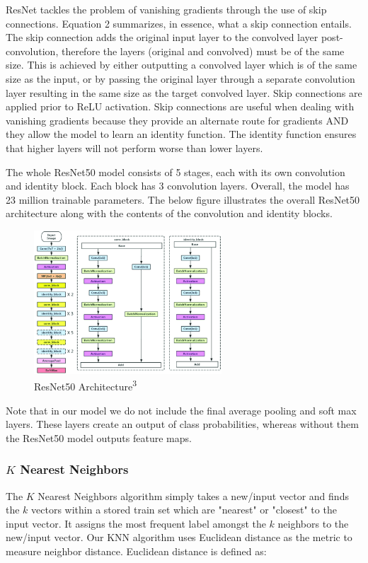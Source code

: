\documentclass[conference]{IEEEtran}
\begin{document}
ResNet tackles the problem of vanishing gradients through the use of skip connections. Equation 2 summarizes, in essence, what a skip connection entails. The skip connection adds the original input layer to the convolved layer post-convolution, therefore the layers (original and convolved) must be of the same size. This is achieved by either outputting a convolved layer which is of the same size as the input, or by passing the original layer through a separate convolution layer resulting in the same size as the target convolved layer. Skip connections are applied prior to ReLU activation. Skip connections are useful when dealing with vanishing gradients because they provide an alternate route for gradients AND they allow the model to learn an identity function. The identity function ensures that higher layers will not perform worse than lower layers.

The whole ResNet50 model consists of 5 stages, each with its own convolution and identity block. Each block has 3 convolution layers. Overall, the model has 23 million trainable parameters. The below figure illustrates the overall ResNet50 architecture along with the contents of the convolution and identity blocks.

\begin{figure}[h]
\includegraphics[width=7cm]{resnet50 arch.png}
\centering 
\caption{ResNet50 Architecture\textsuperscript{3}}
\label{fig:1}
\end{figure}

Note that in our model we do not include the final average pooling and soft max layers. These layers create an output of class probabilities, whereas without them the ResNet50 model outputs feature maps.

\subsubsection{$K$ Nearest Neighbors}
The $K$ Nearest Neighbors algorithm simply takes a new/input vector and finds the $k$ vectors within a stored train set which are "nearest" or "closest" to the input vector. It assigns the most frequent label amongst the $k$ neighbors to the new/input vector. Our KNN algorithm uses Euclidean distance as the metric to measure neighbor distance. Euclidean distance is defined as:
\end{document}
